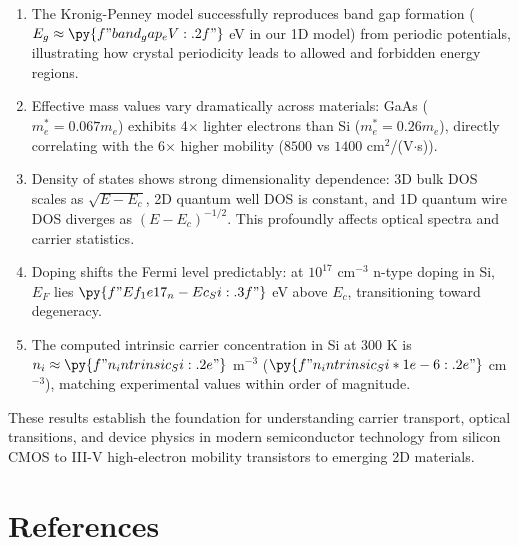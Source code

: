 \documentclass[11pt,a4paper]{article}
\begin{document}
\begin{enumerate}
\item The Kronig-Penney model successfully reproduces band gap formation ($E_g \approx \py{f"{band_gap_eV:.2f}"}$ eV in our 1D model) from periodic potentials, illustrating how crystal periodicity leads to allowed and forbidden energy regions.

\item Effective mass values vary dramatically across materials: GaAs ($m_e^* = 0.067 m_e$) exhibits 4$\times$ lighter electrons than Si ($m_e^* = 0.26 m_e$), directly correlating with the 6$\times$ higher mobility ($8500$ vs $1400$ cm$^2$/(V$\cdot$s)).

\item Density of states shows strong dimensionality dependence: 3D bulk DOS scales as $\sqrt{E-E_c}$, 2D quantum well DOS is constant, and 1D quantum wire DOS diverges as $(E-E_c)^{-1/2}$. This profoundly affects optical spectra and carrier statistics.

\item Doping shifts the Fermi level predictably: at $10^{17}$ cm$^{-3}$ n-type doping in Si, $E_F$ lies $\py{f"{Ef_1e17_n - Ec_Si:.3f}"}$ eV above $E_c$, transitioning toward degeneracy.

\item The computed intrinsic carrier concentration in Si at 300 K is $n_i \approx \py{f"{n_intrinsic_Si:.2e}"}$ m$^{-3}$ ($\py{f"{n_intrinsic_Si * 1e-6:.2e}"}$ cm$^{-3}$), matching experimental values within order of magnitude.
\end{enumerate}

These results establish the foundation for understanding carrier transport, optical transitions,
and device physics in modern semiconductor technology from silicon CMOS to III-V high-electron
mobility transistors to emerging 2D materials.

\section*{References}
\end{document}
